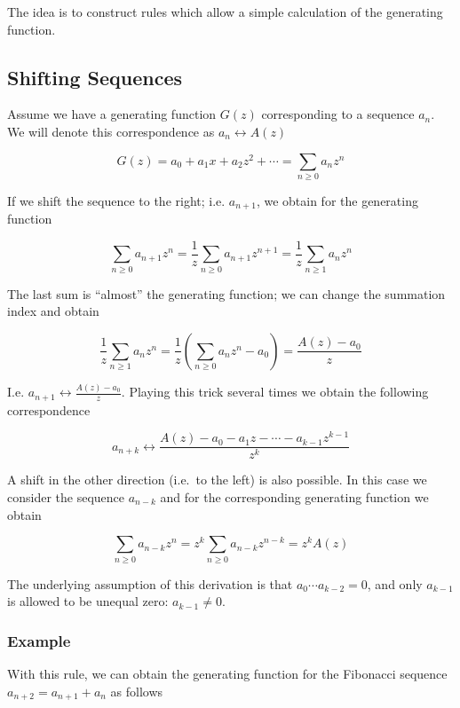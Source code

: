 
The idea is to construct rules which allow a simple calculation of the generating function.

\subsection{Shifting Sequences}\label{shifting-sequences}

Assume we have a generating function $G(z)$ corresponding to a sequence $a_n$. We will denote this correspondence as $a_n \leftrightarrow A(z)$

\[G(z) = a_0 + a_1 x + a_2 z^2 + \cdots = \sum_{n \geq 0} a_n z^n\]

If we shift the sequence to the right; i.e. $a_{n+1}$, we obtain for the generating function

\[\sum_{n \geq 0} a_{n+1} z^n = \frac{1}{z} \sum_{n \geq 0} a_{n+1} z^{n+1} = \frac{1}{z} \sum_{n \geq 1} a_{n} z^{n} \]

The last sum is ``almost'' the generating function; we can change the summation index and obtain

\[ \frac{1}{z} \sum_{n \geq 1} a_{n} z^{n} = \frac{1}{z} \left( \sum_{n \geq 0} a_{n} z^{n} - a_0 \right) = \frac{A(z) - a_0}{z}\]

I.e. $a_{n+1} \leftrightarrow \frac{A(z)-a_0}{z}$. Playing this trick several times we obtain the following correspondence

\[ a_{n+k} \leftrightarrow \frac{A(z) - a_0 - a_1 z - \cdots - a_{k-1}z^{k-1}}{z^k}\]

A shift in the other direction (i.e.~to the left) is also possible. In this case we consider the sequence $a_{n-k}$ and for the corresponding generating function we obtain

\[ \sum_{n \geq 0} a_{n-k} z^n = z^k \sum_{n \geq 0} a_{n-k} z^{n-k} = z^k A(z) \]

The underlying assumption of this derivation is that $a_0 \cdots a_{k-2} = 0$, and only $a_{k-1}$ is allowed to be unequal zero: $a_{k-1} \neq 0$.


\subsubsection{Example}\label{example}

With this rule, we can obtain the generating function for the Fibonacci sequence $a_{n+2} = a_{n+1} + a_n$ as follows

